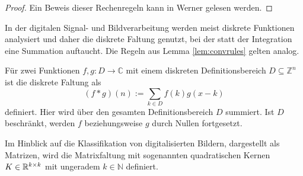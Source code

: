 \begin{proof}
    Ein Beweis dieser Rechenregeln kann in Werner \cite{werner2011funktionalanalysis} gelesen werden.
\end{proof}


In der digitalen Signal- und Bildverarbeitung werden meist diskrete Funktionen analysiert und daher die diskrete Faltung genutzt, bei der statt der Integration eine Summation auftaucht. Die Regeln aus Lemma \ref{lem:convrules} gelten analog.

\begin{defi}\label{disk_faltung}
    Für zwei Funktionen $f,g: D \rightarrow \mathbb{C}$ mit einem diskreten Definitionsbereich $D \subseteq \mathbb{Z}^n$ ist die diskrete Faltung als
    \begin{equation*}
        (f \ast g) (n) := \sum_{k \in D} f(k) g(x-k)
    \end{equation*}
    definiert. Hier wird über den gesamten Definitionsbereich $D$ summiert. Ist $D$ beschränkt, werden $f$ beziehungsweise $g$ durch Nullen fortgesetzt.  
\end{defi}

Im Hinblick auf die Klassifikation von digitalisierten Bildern, dargestellt als Matrizen, wird die Matrixfaltung mit sogenannten quadratischen Kernen $K \in \mathbb{R}^{k \times k}$ mit ungeradem $k \in \mathbb{N}$ definiert.
 
